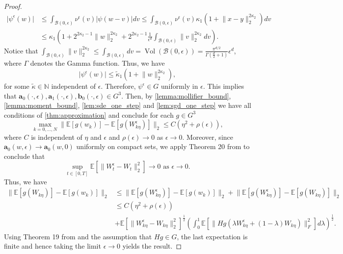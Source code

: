 \documentclass[12pt]{article}
\theoremstyle{definition}
\numberwithin{equation}{section}
\newcommand{\N}{\mathbb{N}}
\newcommand{\CB}{\mathcal{B}}
\newcommand{\moll}{\nu^{\epsilon}}
\newcommand{\ev}[1]{\mathbb{E}\left[{#1}\right]}
\newcommand{\norm}[1]{\lVert{#1}\rVert_2}
\newcommand{\normf}[1]{\lVert{#1}\rVert_F}
\DeclareMathOperator{\vol}{Vol}
\begin{document}
\begin{proof}
\begin{align*}
    \lvert \psi^{\epsilon}(w) \rvert &\leq \int_{\CB(0, \epsilon)} \moll(v) \lvert \psi(w-v) \rvert dv \leq \int_{\CB(0, \epsilon)} \moll(v) \kappa_1 (1 + \norm{x-y}^{2\kappa_2})dv\\
    &\leq \kappa_1\left(1 + 2^{2\kappa_2 - 1} \norm{w}^{2\kappa_2} + 2^{2\kappa_2 - 1}\frac{1}{\epsilon^d}\int_{\CB(0,\epsilon)}\norm{v}^{2\kappa_2}dv\right).
  \end{align*}
  Notice that $\int_{\CB(0,\epsilon)}\norm{v}^{2\kappa_2} \leq \int_{\CB(0,\epsilon)}dv = \vol(\CB(0,\epsilon)) = \frac{\pi^{d/2}}{\Gamma(\frac{d}{2}+1)}\epsilon^d$, where $\Gamma$ denotes the Gamma function. Thus, we have
  \begin{equation*}
    \lvert \psi^{\epsilon}(w) \rvert \leq \widetilde{\kappa}_1(1+ \norm{w}^{2\kappa_2}),
  \end{equation*}
  for some $\widetilde{\kappa} \in \N$ independent of $\epsilon$.
  Therefore, $\psi^{\epsilon} \in G$ uniformly in $\epsilon$.
  This implies that $\mathbf{a}_0(\cdot,\epsilon), \mathbf{a}_1(\cdot,\epsilon),\mathbf{b}_0(\cdot, \epsilon) \in G^3$.
  Then, by \autoref{lemma:mollifier_bound}, \autoref{lemma:moment_bound}, \autoref{lem:sde_one_step} and \autoref{lem:sgd_one_step} we have all conditions of \autoref{thm:approximation} and conclude for each $g \in G^3$
  \begin{equation*}
    \max_{k=0,\dots,N}\norm{\ev{g(w_k)} - \ev{g(W^{\epsilon}_{k\eta})}} \leq C(\eta^2 + \rho(\epsilon)),
  \end{equation*}
  where $C$ is independent of $\eta$ and $\epsilon$ and $\rho(\epsilon) \rightarrow 0$ as $\epsilon \rightarrow 0$. Moreover, since $\mathbf{a}_0(w, \epsilon) \rightarrow \mathbf{a}_0(w, 0)$ uniformly on compact sets, we apply Theorem 20 from \cite{liStochasticModifiedEquations2019} to conclude that
  \begin{equation*}
    \sup_{t \in [0,T]}\ev{\norm{W^{\epsilon}_t - W_t}^2} \rightarrow 0 \text{ as } \epsilon \rightarrow 0.
  \end{equation*}
  Thus, we have
  \begin{align*}
    \norm{\ev{g(W_{k\eta})} - \ev{g(w_k)}} &\leq  \norm{\ev{g(W_{k\eta}^\epsilon)} - \ev{g(w_k)}} + \norm{\ev{g(W_{k\eta}^{\epsilon})} - \ev{g(W_{k\eta})}} \\
    &\leq C(\eta^2 + \rho(\epsilon)) \\
    &+ \ev{\norm{W^{\epsilon}_{k\eta} - W_{k\eta}}^2}^{\frac{1}{2}} \left( \int_0^1 \ev{\normf{Hg(\lambda W^{\epsilon}_{k\eta} + (1-\lambda)W_{k\eta})}^2}d\lambda\right)^{\frac{1}{2}}.
  \end{align*}
  Using Theorem 19 from \cite{liStochasticModifiedEquations2019} and the assumption that $Hg \in G$, the last expectation is finite and hence taking the limit $\epsilon \rightarrow 0$ yields the result.
\end{proof}
\end{document}
